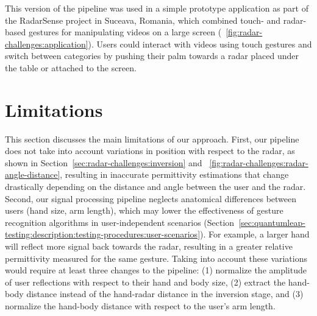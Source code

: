 This version of the pipeline was used in a simple prototype application as part of the RadarSense project in Suceava, Romania, which combined touch- and radar-based gestures for manipulating videos on a large screen (\fig~\ref{fig:radar-challenges:application}). Users could interact with videos using touch gestures and switch between categories by pushing their palm towards a radar placed under the table or attached to the screen.

\section{Limitations} \label{sec:radar-challenges:limitations}
This section discusses the main limitations of our approach.
%
First, our pipeline does not take into account variations in position with respect to the radar, as shown in Section~\ref{sec:radar-challenges:inversion} and \fig~\ref{fig:radar-challenges:radar-angle-distance}, resulting in inaccurate permittivity estimations that change drastically depending on the distance and angle between the user and the radar.
%
Second, our signal processing pipeline neglects anatomical differences between users (\eg hand size, arm length), which may lower the effectiveness of gesture recognition algorithms in user-independent scenarios (Section~\ref{sec:quantumleap-testing:description:testing-procedures:user-scenarios}). For example, a larger hand will reflect more signal back towards the radar, resulting in a greater relative permittivity measured for the same gesture. Taking into account these variations would require at least three changes to the pipeline: (1) normalize the amplitude of user reflections with respect to their hand and body size, (2) extract the hand-body distance instead of the hand-radar distance in the inversion stage, and (3) normalize the hand-body distance with respect to the user's arm length.




